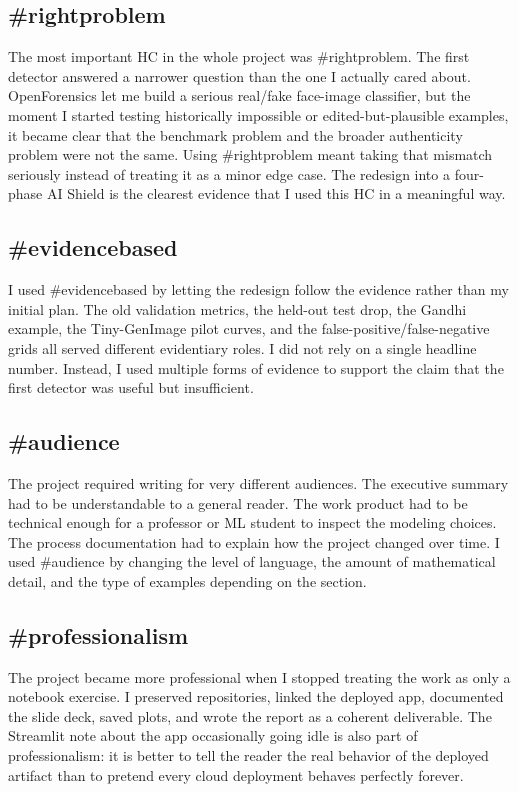 \documentclass[11pt]{article}
\begin{document}
\subsection*{\#rightproblem}
The most important HC in the whole project was \#rightproblem. The first detector answered a narrower question than the one I actually cared about. OpenForensics let me build a serious real/fake face-image classifier, but the moment I started testing historically impossible or edited-but-plausible examples, it became clear that the benchmark problem and the broader authenticity problem were not the same. Using \#rightproblem meant taking that mismatch seriously instead of treating it as a minor edge case. The redesign into a four-phase AI Shield is the clearest evidence that I used this HC in a meaningful way.

\subsection*{\#evidencebased}
I used \#evidencebased by letting the redesign follow the evidence rather than my initial plan. The old validation metrics, the held-out test drop, the Gandhi example, the Tiny-GenImage pilot curves, and the false-positive/false-negative grids all served different evidentiary roles. I did not rely on a single headline number. Instead, I used multiple forms of evidence to support the claim that the first detector was useful but insufficient.

\subsection*{\#audience}
The project required writing for very different audiences. The executive summary had to be understandable to a general reader. The work product had to be technical enough for a professor or ML student to inspect the modeling choices. The process documentation had to explain how the project changed over time. I used \#audience by changing the level of language, the amount of mathematical detail, and the type of examples depending on the section.

\subsection*{\#professionalism}
The project became more professional when I stopped treating the work as only a notebook exercise. I preserved repositories, linked the deployed app, documented the slide deck, saved plots, and wrote the report as a coherent deliverable. The Streamlit note about the app occasionally going idle is also part of professionalism: it is better to tell the reader the real behavior of the deployed artifact than to pretend every cloud deployment behaves perfectly forever.
\end{document}
